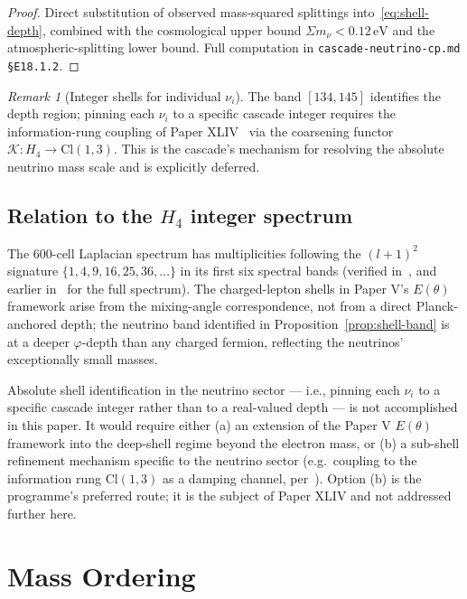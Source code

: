 \documentclass[12pt]{article}
\theoremstyle{definition}
\theoremstyle{remark}
\newtheorem{remark}[theorem]{Remark}
\begin{document}
\begin{proof}
Direct substitution of observed mass-squared splittings into~\eqref{eq:shell-depth}, combined with the cosmological upper bound $\Sigma m_\nu < 0.12\,\mathrm{eV}$ and the atmospheric-splitting lower bound. Full computation in \texttt{cascade-neutrino-cp.md §E18.1.2}.
\end{proof}

\begin{remark}[Integer shells for individual $\nu_i$]
The band $[134, 145]$ identifies the depth region; pinning each $\nu_i$ to a specific cascade integer requires the information-rung coupling of Paper XLIV~\citep{SmartXLIV} via the coarsening functor $\mathcal{K}: H_4 \to \mathrm{Cl}(1,3)$. This is the cascade's mechanism for resolving the absolute neutrino mass scale and is explicitly deferred.
\end{remark}

\subsection{Relation to the $H_4$ integer spectrum}

The 600-cell Laplacian spectrum has multiplicities following the $(l+1)^2$ signature $\{1, 4, 9, 16, 25, 36, \ldots\}$ in its first six spectral bands (verified in~\citep{SmartXXXV}, and earlier in~\citep{SmartV} for the full spectrum). The charged-lepton shells in Paper V's $E(\theta)$ framework arise from the mixing-angle correspondence, not from a direct Planck-anchored depth; the neutrino band identified in Proposition~\ref{prop:shell-band} is at a deeper $\varphi$-depth than any charged fermion, reflecting the neutrinos' exceptionally small masses.

Absolute shell identification in the neutrino sector --- i.e., pinning each $\nu_i$ to a specific cascade integer rather than to a real-valued depth --- is not accomplished in this paper. It would require either (a) an extension of the Paper V $E(\theta)$ framework into the deep-shell regime beyond the electron mass, or (b) a sub-shell refinement mechanism specific to the neutrino sector (e.g.\ coupling to the information rung $\mathrm{Cl}(1,3)$ as a damping channel, per~\citep{SmartXLIV}). Option (b) is the programme's preferred route; it is the subject of Paper XLIV and not addressed further here.

\section{Mass Ordering}\label{sec:ordering}
\end{document}
